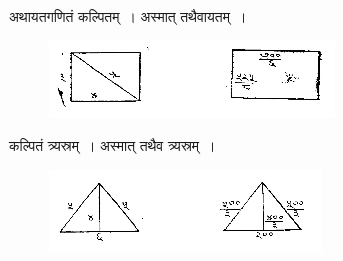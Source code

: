 \documentclass[11pt, openany]{book}
\begin{document}
 अथायतगणितं कल्पितम्~। अस्मात् तथैवायतम्~। 
\vspace{-2mm}

\begin{figure}[h!]
     \centering
     \includegraphics[scale=0.85]{graphics/capture145.png}
\end{figure} 
\vspace{-2mm}

कल्पितं त्र्यस्रम्~। अस्मात् तथैव त्र्यस्रम्~।
\vspace{-2mm}

\begin{figure}[h!]
     \centering
     \includegraphics[scale=0.85]{graphics/capture146.png}
\end{figure} 
\vspace{-2mm}
\end{document}
